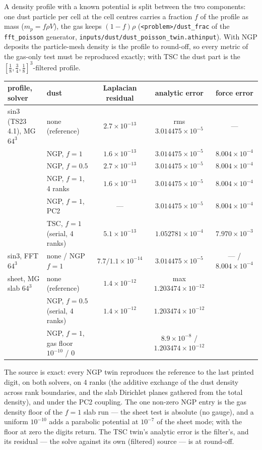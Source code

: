 \documentclass[11pt]{article}
\newcommand{\code}[1]{\texttt{#1}}
\newcommand{\file}[1]{\texttt{#1}}
\begin{document}
A density profile with a known potential is split between the two components: one dust
particle per cell at the cell centres carries a fraction $f$ of the profile as mass
($m_p = f\rho V$), the gas keeps $(1-f)\rho$ (\code{<problem>/dust\_frac} of the
\code{fft\_poisson} generator, \file{inputs/dust/dust\_poisson\_twin.athinput}). With NGP
deposits the particle-mesh density is the profile to round-off, so every metric of the
gas-only test must be reproduced exactly; with TSC the dust part is the
$[\tfrac18,\tfrac34,\tfrac18]^3$-filtered profile.

\begin{center}
\small
\begin{tabular}{@{}llccc@{}}
\toprule
profile, solver & dust & Laplacian residual & analytic error & force error \\
\midrule
sin3 (TS23 4.1), MG $64^3$ & none (reference) & $2.7\times10^{-13}$ & rms $3.014475\times10^{-5}$ & --- \\
 & NGP, $f = 1$ & $1.6\times10^{-13}$ & $3.014475\times10^{-5}$ & $8.004\times10^{-4}$ \\
 & NGP, $f = 0.5$ & $2.7\times10^{-13}$ & $3.014475\times10^{-5}$ & $8.004\times10^{-4}$ \\
 & NGP, $f = 1$, 4 ranks & $1.6\times10^{-13}$ & $3.014475\times10^{-5}$ & $8.004\times10^{-4}$ \\
 & NGP, $f = 1$, PC2 & --- & $3.014475\times10^{-5}$ & $8.004\times10^{-4}$ \\
 & TSC, $f = 1$ (serial, 4 ranks) & $5.1\times10^{-13}$ & $1.052781\times10^{-4}$ & $7.970\times10^{-3}$ \\
sin3, FFT $64^3$ & none / NGP $f = 1$ & $7.7 / 1.1\times10^{-14}$ & $3.014475\times10^{-5}$ & --- / $8.004\times10^{-4}$ \\
sheet, MG slab $64^3$ & none (reference) & $1.4\times10^{-12}$ & max $1.203474\times10^{-12}$ & \\
 & NGP, $f = 0.5$ (serial, 4 ranks) & $1.4\times10^{-12}$ & $1.203474\times10^{-12}$ & \\
 & NGP, $f = 1$, gas floor $10^{-10}$ / $0$ & & $8.9\times10^{-8}$ / $1.203474\times10^{-12}$ & \\
\bottomrule
\end{tabular}
\end{center}

The source is exact: every NGP twin reproduces the reference to the last printed digit,
on both solvers, on 4 ranks (the additive exchange of the dust density across rank
boundaries, and the slab Dirichlet planes gathered from the total density), and under
the PC2 coupling. The one non-zero NGP entry is the gas density floor of the $f = 1$
slab run --- the sheet test is absolute (no gauge), and a uniform $10^{-10}$ adds a
parabolic potential at $10^{-7}$ of the sheet mode; with the floor at zero the digits
return. The TSC twin's analytic error is the filter's, and its residual --- the solve
against its own (filtered) source --- is at round-off.
\end{document}
